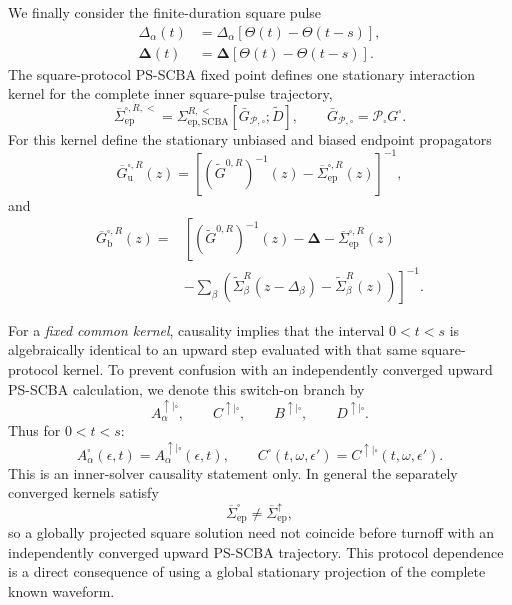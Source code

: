 \documentclass[
 reprint,
 superscriptaddress,
 amsmath,amssymb,
 aps,prb,
 longbibliography,
 floatfix
]{revtex4-2}
\newcommand{\ep}{\mathrm{ep}}
\newcommand{\barSigma}{\overline{\Sigma}}
\newcommand{\proj}{\mathcal P}
\begin{document}
We finally consider the finite-duration square pulse
\begin{equation*}
\begin{aligned}
\Delta_\alpha(t)
&=
\Delta_\alpha
\left[
\Theta(t)-\Theta(t-s)
\right],
\\
\bm\Delta(t)
&=
\bm\Delta
\left[
\Theta(t)-\Theta(t-s)
\right].
\end{aligned}
\end{equation*}
The square-protocol PS-SCBA fixed point defines one stationary interaction kernel for the complete inner square-pulse trajectory,
\begin{equation*}
\barSigma_{\ep}^{\square,R,<}
=
\Sigma_{\ep,\mathrm{SCBA}}^{R,<}
\!\left[
\bar G_{\mathcal P,\square};
\widetilde D
\right],
\qquad
\bar G_{\mathcal P,\square}
=
\proj_\square G^\square .
\end{equation*}
For this kernel define the stationary unbiased and biased endpoint propagators
\begin{equation*}
\overline G_{\mathrm u}^{\square,R}(z)
=
\left[
(\widetilde G^{0,R})^{-1}(z)
-
\barSigma_{\ep}^{\square,R}(z)
\right]^{-1},
\end{equation*}
and
\begin{equation*}
\begin{aligned}
\overline G_{\mathrm b}^{\square,R}(z)
=&
\left[
(\widetilde G^{0,R})^{-1}(z)
-
\bm\Delta
-
\overline{\Sigma}_{\ep}^{\square,R}(z)
\right.\\
&\left.
-
\sum_\beta
\left(
\widetilde\Sigma_\beta^R(z-\Delta_\beta)
-
\widetilde\Sigma_\beta^R(z)
\right)
\right]^{-1}.
\end{aligned}
\end{equation*}

For a \emph{fixed common kernel}, causality implies that the interval \(0<t<s\) is algebraically identical to an upward step evaluated with that same square-protocol kernel. To prevent confusion with an independently converged upward PS-SCBA calculation, we denote this switch-on branch by
\begin{equation*}
A_\alpha^{\uparrow|\square},
\qquad
C^{\uparrow|\square},
\qquad
B^{\uparrow|\square},
\qquad
D^{\uparrow|\square}.
\end{equation*}
Thus for $0<t<s$:
\begin{equation*}
A_\alpha^\square(\epsilon,t)
=
A_\alpha^{\uparrow|\square}(\epsilon,t),
\qquad
C^\square(t,\omega,\epsilon')
=
C^{\uparrow|\square}(t,\omega,\epsilon').
\end{equation*}
This is an inner-solver causality statement only. In general the separately converged kernels satisfy
\begin{equation*}
\barSigma_{\ep}^{\square}
\neq
\barSigma_{\ep}^{\uparrow},
\end{equation*}
so a globally projected square solution need not coincide before turnoff with an independently converged upward PS-SCBA trajectory. This protocol dependence is a direct consequence of using a global stationary projection of the complete known waveform.
\end{document}
